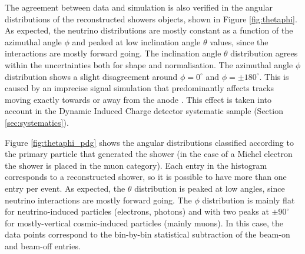 The agreement between data and simulation is also verified in the angular distributions of the reconstructed showers objects, shown in Figure \ref{fig:thetaphi}. As expected, the neutrino distributions are mostly constant as a function of the azimuthal angle $\phi$ and peaked at low inclination angle $\theta$ values, since the interactions are mostly forward going. The inclination angle $\theta$ distribution agrees within the uncertainties both for shape and normalisation. The azimuthal angle $\phi$ distribution shows a slight disagreement around $\phi = 0^{\circ}$ and $\phi = \pm180^{\circ}$. This is caused by an imprecise signal simulation that predominantly affects tracks moving exactly towards or away from the anode \cite{Adams:2018gbi}. This effect is taken into account in the Dynamic Induced Charge detector systematic sample (Section \ref{sec:systematics}). 

Figure \ref{fig:thetaphi_pdg} shows the angular distributions classified according to the primary particle that generated the shower (in the case of a Michel electron the shower is placed in the muon category). Each entry in the histogram corresponds to a reconstructed shower, so it is possible to have more than one entry per event. As expected, the $\theta$ distribution is peaked at low angles, since neutrino interactions are mostly forward going. The $\phi$ distribution is mainly flat for neutrino-induced particles (electrons, photons) and with two peaks at $\pm90^{\circ}$ for mostly-vertical cosmic-induced particles (mainly muons). In this case, the data points correspond to the bin-by-bin statistical subtraction of the beam-on and beam-off entries.


